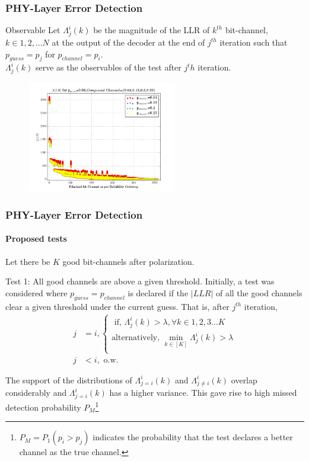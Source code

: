 \documentclass[xcolor=dvipsnames]{beamer}
\begin{document}
\begin{frame}[label=obs]
\frametitle{PHY-Layer Error Detection}
\begin{block}{Observable}
Let $\Lambda_j^i(k)$ be the magnitude of the LLR of $k^{th}$ bit-channel, $k\in{1,2,...N}$ at the output of the decoder at the end of $j^{th}$ iteration such that $p_{guess}=p_j$ for $p_{channel}=p_i$.\\ $\Lambda_j^i(k)$ serve as the observables of the test after $j^th$ iteration.
\end{block}
\begin{figure}[h]
 \begin{center}
    \includegraphics[width=6.5cm]{absllr0p04.png}
  \end{center}
  \label{fig:iswrpc}
\end{figure}
\end{frame}
\begin{frame}[label=test1]
\frametitle{PHY-Layer Error Detection}
\framesubtitle{Proposed tests}
Let there be $K$ good bit-channels after polarization.  
\begin{block}{Test 1: All good channels are above a given threshold.}
Initially, a test was considered where $p_{guess}=p_{channel}$ is declared if the $|LLR|$ of all the good channels clear a given threshold under the current guess. That is, after $j^{th}$ iteration,
\begin{align*}  
j & =i, 
\begin{cases}
\text{   if, }  \Lambda_{j}^i(k) > \lambda, \forall k \in {1,2,3...K}\\
\text{alternatively, } \displaystyle\min_{k \in [K]}\Lambda_{j}^i(k) > \lambda  \\
\end{cases}\\
 j & < i,  \text{ o.w.}
\end{align*} 
\end{block}
\small
The support of the distributions of $\Lambda_{j=i}^i(k)$ and $\Lambda_{j \neq i}^i(k)$ overlap considerably and $\Lambda_{j=i}^i(k)$ has a higher variance.
This gave rise to high missed detection probability $P_M$\footnote{\tiny $P_M=P_1(p_i>p_j)$ indicates the probability that the test declares a better channel as the true channel.}
\end{frame}
\end{document}
